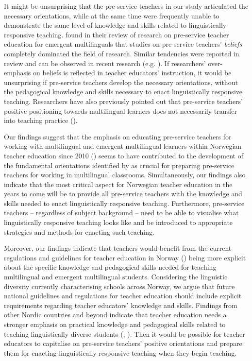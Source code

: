 \documentclass[output=paper]{langscibook}
\begin{document}
It might be unsurprising that the pre-service teachers in our study articulated the necessary orientations, while at the same time were frequently unable to demonstrate the same level of knowledge and skills related to linguistically responsive teaching. \citet{VillegasEtAl2018} found in their review of research on pre-service teacher education for emergent multilinguals that studies on pre-service teachers’ \textit{beliefs} completely dominated the field of research. Similar tendencies were reported in  review and can be observed in recent research (e.g. \citealt{Aleksic2023,Doll2023,Duarte2022,SchroedlerEtAl2023,Thoma2022}). If researchers’ over-emphasis on beliefs is reflected in teacher educators’ instruction, it would be unsurprising if pre-service teachers develop the necessary orientations, without the pedagogical knowledge and skills necessary to enact linguistically responsive teaching. Researchers have also previously pointed out that pre-service teachers’ positive positioning towards multilingual learners does not necessarily transfer into teaching practice (\citealt{SchroedlerEtAl2023}).

Our findings suggest that the emphasis on educating pre-service teachers for working with multilingual and emergent multilingual learners within Norwegian teacher education since 2010 (\citealt{MER2016,UHR2016}) seems to have contributed to the development of the fundamental orientations identified by \citet{Villegas2018} as crucial for preparing pre-service teachers for working in multilingual classrooms. Simultaneously, our findings also indicate that the most critical aspect for Norwegian teacher education in the years to come will be to provide all pre-service teachers with the knowledge and skills needed to enact linguistically responsive teaching. Furthermore, pre-service teachers – regardless of subject background – need to be able to visualise what linguistically responsive teaching looks like and be introduced to appropriate strategies and methods for enacting such teaching.

Moreover, our findings indicate that teachers would benefit from the  current regulations and guidelines for teacher education in Norway (\citealt{MER2016, UHR2016}) being more explicit about the specific knowledge and pedagogical skills needed for teaching multilingual and emergent multilingual students. Considering the linguistic diversity currently characterising schools across Norway, we argue that future national guidelines and regulations for teacher education should include explicit requirements regarding teacher educators’ knowledge and skills. Findings from other Nordic countries and beyond indicate that teacher education needs a stronger emphasis on practical knowledge and pedagogical skills related to teaching linguistically diverse students (\citealt{chapters/2_Gunnthorsdottira}, \citealt{SchroedlerEtAl2023}). Then it would be possible for teacher educators to capitalise on pre-service teachers’ positive orientations and prepare them for enacting linguistically responsive teaching when they begin teaching.

\printbibliography[heading=subbibliography,notkeyword=this]
\end{document}

